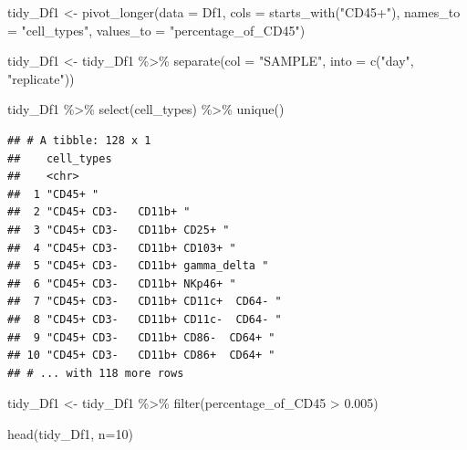 \documentclass[
]{book}
\newenvironment{Shaded}{\begin{snugshade}}{\end{snugshade}}
\newcommand{\AttributeTok}[1]{\textcolor[rgb]{0.77,0.63,0.00}{#1}}
\newcommand{\DecValTok}[1]{\textcolor[rgb]{0.00,0.00,0.81}{#1}}
\newcommand{\FloatTok}[1]{\textcolor[rgb]{0.00,0.00,0.81}{#1}}
\newcommand{\FunctionTok}[1]{\textcolor[rgb]{0.00,0.00,0.00}{#1}}
\newcommand{\NormalTok}[1]{#1}
\newcommand{\OtherTok}[1]{\textcolor[rgb]{0.56,0.35,0.01}{#1}}
\newcommand{\SpecialCharTok}[1]{\textcolor[rgb]{0.00,0.00,0.00}{#1}}
\newcommand{\StringTok}[1]{\textcolor[rgb]{0.31,0.60,0.02}{#1}}
\begin{document}
\begin{Shaded}
\begin{Highlighting}[]
\NormalTok{tidy\_Df1 }\OtherTok{\textless{}{-}} \FunctionTok{pivot\_longer}\NormalTok{(}\AttributeTok{data =}\NormalTok{ Df1, }\AttributeTok{cols =}  \FunctionTok{starts\_with}\NormalTok{(}\StringTok{"CD45+"}\NormalTok{), }\AttributeTok{names\_to =} \StringTok{"cell\_types"}\NormalTok{, }\AttributeTok{values\_to =} \StringTok{"percentage\_of\_CD45"}\NormalTok{) }

\NormalTok{tidy\_Df1 }\OtherTok{\textless{}{-}}\NormalTok{ tidy\_Df1 }\SpecialCharTok{\%\textgreater{}\%}
  \FunctionTok{separate}\NormalTok{(}\AttributeTok{col =} \StringTok{"SAMPLE"}\NormalTok{, }\AttributeTok{into =} \FunctionTok{c}\NormalTok{(}\StringTok{"day"}\NormalTok{, }\StringTok{"replicate"}\NormalTok{))}


\NormalTok{tidy\_Df1 }\SpecialCharTok{\%\textgreater{}\%}
  \FunctionTok{select}\NormalTok{(cell\_types) }\SpecialCharTok{\%\textgreater{}\%}
  \FunctionTok{unique}\NormalTok{()}
\end{Highlighting}
\end{Shaded}

\begin{verbatim}
## # A tibble: 128 x 1
##    cell_types                          
##    <chr>                               
##  1 "CD45+ "                            
##  2 "CD45+ CD3-   CD11b+ "              
##  3 "CD45+ CD3-   CD11b+ CD25+ "        
##  4 "CD45+ CD3-   CD11b+ CD103+ "       
##  5 "CD45+ CD3-   CD11b+ gamma_delta "  
##  6 "CD45+ CD3-   CD11b+ NKp46+ "       
##  7 "CD45+ CD3-   CD11b+ CD11c+  CD64- "
##  8 "CD45+ CD3-   CD11b+ CD11c-  CD64- "
##  9 "CD45+ CD3-   CD11b+ CD86-  CD64+ " 
## 10 "CD45+ CD3-   CD11b+ CD86+  CD64+ " 
## # ... with 118 more rows
\end{verbatim}

\begin{Shaded}
\begin{Highlighting}[]
\NormalTok{tidy\_Df1 }\OtherTok{\textless{}{-}}\NormalTok{ tidy\_Df1 }\SpecialCharTok{\%\textgreater{}\%}
  \FunctionTok{filter}\NormalTok{(percentage\_of\_CD45 }\SpecialCharTok{\textgreater{}} \FloatTok{0.005}\NormalTok{)}

\FunctionTok{head}\NormalTok{(tidy\_Df1, }\AttributeTok{n=}\DecValTok{10}\NormalTok{)}
\end{Highlighting}
\end{Shaded}
\end{document}
